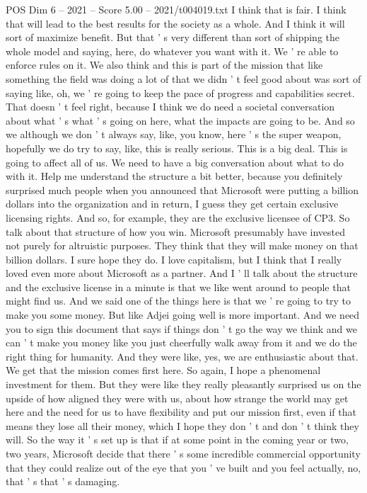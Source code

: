 \begin{textsample}{POS Dim 6 – 2021 – Score 5.00 – 2021/t004019.txt}
I think that is fair.
I think that will lead to the best results for the society as a whole.
And I think it will sort of maximize benefit.
But that ' s very different than sort of shipping the whole model and saying, here, do whatever you want with it.
We ' re able to enforce rules on it.
We also think and this is part of the mission that like something the field was doing a lot of that we didn ' t feel good about was sort of saying like, oh, we ' re going to keep the pace of progress and capabilities secret.
That doesn ' t feel right, because I think we do need a societal conversation about what ' s what ' s going on here, what the impacts are going to be.
And so we although we don ' t always say, like, you know, here ' s the super weapon, hopefully we do try to say, like, this is really serious.
This is a big deal.
This is going to affect all of us.
We need to have a big conversation about what to do with it.
Help me understand the structure a bit better, because you definitely surprised much people when you announced that Microsoft were putting a billion dollars into the organization and in return, I guess they get certain exclusive licensing rights.
And so, for example, they are the exclusive licensee of CP3.
So talk about that structure of how you win.
Microsoft presumably have invested not purely for altruistic purposes.
They think that they will make money on that billion dollars.
I sure hope they do.
I love capitalism, but I think that I really loved even more about Microsoft as a partner.
And I ' ll talk about the structure and the exclusive license in a minute is that we like went around to people that might find us.
And we said one of the things here is that we ' re going to try to make you some money.
But like Adjei going well is more important.
And we need you to sign this document that says if things don ' t go the way we think and we can ' t make you money like you just cheerfully walk away from it and we do the right thing for humanity.
And they were like, yes, we are enthusiastic about that.
We get that the mission comes first here.
So again, I hope a phenomenal investment for them.
But they were like they really pleasantly surprised us on the upside of how aligned they were with us, about how strange the world may get here and the need for us to have flexibility and put our mission first, even if that means they lose all their money, which I hope they don ' t and don ' t think they will.
So the way it ' s set up is that if at some point in the coming year or two, two years, Microsoft decide that there ' s some incredible commercial opportunity that they could realize out of the eye that you ' ve built and you feel actually, no, that ' s that ' s damaging.

\end{textsample}
